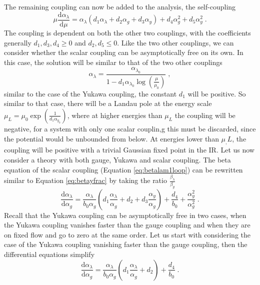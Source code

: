 The remaining coupling can now be added to the analysis, the self-coupling
\begin{equation}
    \mu \frac{\text{d} \alpha_\lambda}{\text{d}\mu}=\alpha_\lambda\left(d_1\alpha_\lambda + d_2\alpha_g+d_3\alpha_y\right)+d_4\alpha_g^2+d_5\alpha_y^2\;.\label{eq:betalam1loop}
\end{equation}
The coupling is dependent on both the other two couplings, with the coefficients generally $d_1,d_3,d_4\ge0$ and $d_2,d_5\le 0$. Like the two other couplings, we can consider whether the scalar coupling can be asymptotically free on its own. In this case, the solution will be similar to that of the two other couplings
\begin{equation}
    \alpha_\lambda=\frac{\alpha_{\lambda_0}}{1-d_1 \alpha_{\lambda_0} \log \left(\frac{\mu}{\mu_0 }\right)}\;,
\end{equation}
similar to the case of the Yukawa coupling, the constant $d_1$ will be positive. So similar to that case, there will be a Landau pole at the energy scale $\mu_L=\mu_0\exp(\frac1{d_1\alpha_{y_0}})$, where at higher energies than $\mu_L$ the coupling will be negative, for a system with only one scalar couplin,g this must be discarded, since the potential would be unbounded from below. At energies lower than $\mu_,L$, the coupling will be positive with a trivial Gaussian fixed point in the IR. 
Let us now consider a theory with both gauge, Yukawa and scalar coupling. The beta equation of the scalar coupling (Equation \ref{eq:betalam1loop}) can be rewritten similar to Equation \ref{eq:betayfrac} by taking the ratio $\frac{\beta_\lambda}{\beta_g}$
\begin{equation}
    \frac{\text{d} \alpha_\lambda}{\text{d}\alpha_g}=\frac{\alpha_\lambda}{b_0\alpha_g}\left(d_1\frac{\alpha_\lambda}{\alpha_g} + d_2+d_3\frac{\alpha_y}{\alpha_g}\right)+\frac{d_4}{b_0}+\frac{\alpha_y^2}{\alpha_g^2}\;.\label{eq:betalam1loop}
\end{equation}
Recall that the Yukawa coupling can be asymptotically free in two cases, when the Yukawa coupling vanishes faster than the gauge coupling and when they are on fixed flow and go to zero at the same order. Let us start with considering the case of the Yukawa coupling vanishing faster than the gauge coupling, then the differential equations simplify
\begin{equation}
    \frac{\text{d} \alpha_\lambda}{\text{d}\alpha_g}=\frac{\alpha_\lambda}{b_0\alpha_g}\left(d_1\frac{\alpha_\lambda}{\alpha_g} + d_2\right)+\frac{d_4}{b_0}\;.
    \label{eq:betalamfrac}
\end{equation}
